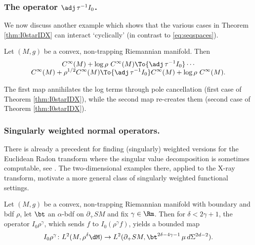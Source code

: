 \subsubsection*{The operator $\adj \, \tau^{-1} I_0$.}
We now discuss another example which shows that the various cases in Theorem \ref{thm:I0starIDX} can interact `cyclically' (in contrast to \eqref{eq:seqspaces}).

\begin{Corollary}
Let $(M,g)$ be a convex, non-trapping Riemannian manifold. Then
\begin{multline*}
C^\infty(M) + \log\rho\ C^\infty(M) \To{\adj \, \tau^{-1} I_0} \cdots\\[-5pt]
C^\infty(M) + \rho^{1/2} C^\infty (M) \To{\adj \, \tau^{-1} I_0} C^\infty(M) + \log\rho\ C^\infty(M).
\end{multline*}
\end{Corollary}
The first map annihilates the log terms through pole cancellation (first case of Theorem \ref{thm:I0starIDX}), while the second map re-creates them (second case of Theorem \ref{thm:I0starIDX}).

\subsubsection*{Singularly weighted normal operators.}

There is already a precedent for finding (singularly) weighted versions for the Euclidean Radon transform where the singular value decomposition
is sometimes computable, see \eg \cite{Louis1984}. The two-dimensional examples there, applied to the X-ray transform, motivate a more
general class of singularly weighted functional settings.

\begin{Proposition}\label{prop:weightedI0}
Let $(M,g)$ be a convex, non-trapping Riemannian manifold with boundary and bdf $\rho$, let $\bt$ an $\alpha$-bdf on $\partial_+ SM$ and fix $\gamma\in\Rm$. Then
for $\delta<2\gamma+1$, the operator $I_0 \rho^\gamma$, which sends $f$ to $I_0 (\rho^\gamma f)$, yields a bounded map
\begin{equation*}
I_0 \rho^{\gamma} \colon L^2(M, \rho^{\delta}\dM) \to L^2(\partial_+ SM, \bt^{2\delta-4\gamma-1}\, \mu \, d\Sigma^{2d-2}).
\end{equation*}
\end{Proposition}


